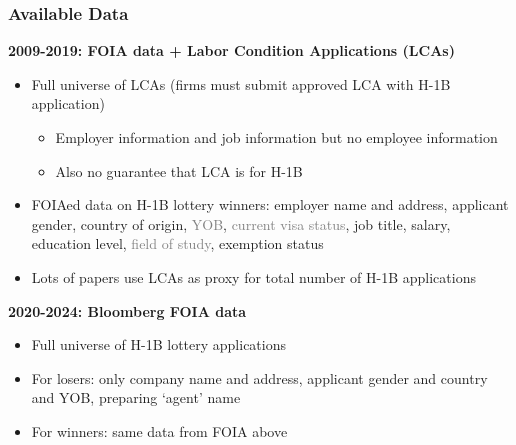 \documentclass[xcolor=dvipsnames, compress, 12pt, aspectratio=169, handout]{beamer}
\begin{document}
\begin{frame}\label{data}
    \frametitle{Available Data}
    \textbf{2009-2019: FOIA data + Labor Condition Applications (LCAs)}
    \begin{itemize}
        \item Full universe of LCAs (firms must submit approved LCA with H-1B application) \hyperlink{h1bfiling}{}
        \begin{itemize}
            \item Employer information and job information but no employee information 
            \item Also no guarantee that LCA is for H-1B
        \end{itemize}
        \item FOIAed data on H-1B lottery winners: employer name and address, applicant gender, country of origin, \textcolor{gray}{YOB}, \textcolor{gray}{current visa status}, job title, salary, education level, \textcolor{gray}{field of study}, exemption status
        \item Lots of papers use LCAs as proxy for total number of H-1B applications
    \end{itemize}
    \textbf{2020-2024: Bloomberg FOIA data} \hyperlink{h1bdesc}{}
    \begin{itemize}
            \item Full universe of H-1B lottery applications
            \item For losers: only company name and address, applicant gender and country and YOB, preparing `agent' name 
            \item For winners: same data from FOIA above 
    \end{itemize}
\end{frame}
\end{document}
